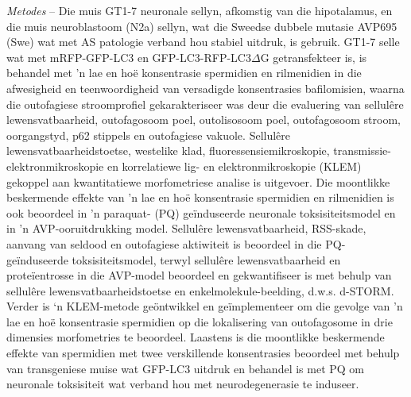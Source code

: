 \textit{Metodes} – Die muis GT1-7 neuronale sellyn, afkomstig van die hipotalamus, en die muis neuroblastoom (N2a) sellyn, wat die Sweedse dubbele mutasie AVP695 (Swe) wat met AS patologie verband hou stabiel uitdruk, is gebruik. GT1-7 selle wat met mRFP-GFP-LC3 en GFP-LC3-RFP-LC3$\Delta$G getransfekteer is, is behandel met 'n lae en ho{\"e} konsentrasie spermidien en rilmenidien in die afwesigheid en teenwoordigheid van versadigde konsentrasies bafilomisien, waarna die outofagiese stroomprofiel gekarakteriseer was deur die evaluering van sellulêre lewensvatbaarheid, outofagosoom poel, outolisosoom poel, outofagosoom stroom, oorgangstyd, p62 stippels en outofagiese vakuole. Sellul{\^e}re lewensvatbaarheidstoetse, westelike klad, fluoressensiemikroskopie, transmissie-elektronmikroskopie en korrelatiewe lig- en elektronmikroskopie (KLEM) gekoppel aan kwantitatiewe morfometriese analise is uitgevoer. Die moontlikke beskermende effekte van 'n lae en ho{\"e} konsentrasie spermidien en rilmenidien is ook beoordeel in 'n paraquat- (PQ) ge{\"i}nduseerde neuronale toksisiteitsmodel en in 'n AVP-ooruitdrukking model. Sellul{\^e}re lewensvatbaarheid, RSS-skade, aanvang van seldood en outofagiese aktiwiteit is beoordeel in die PQ-ge{\"i}nduseerde toksisiteitsmodel, terwyl sellul{\^e}re lewensvatbaarheid en prote{\"i}entrosse in die AVP-model beoordeel en gekwantifiseer is met behulp van sellul{\^e}re lewensvatbaarheidstoetse en enkelmolekule-beelding, d.w.s. d-STORM. Verder is ‘n KLEM-metode ge{\"o}ntwikkel en ge{\"i}mplementeer om die gevolge van 'n lae en ho{\"e} konsentrasie spermidien op die lokalisering van outofagosome in drie dimensies morfometries te beoordeel. Laastens is die moontlikke beskermende effekte van spermidien met twee verskillende konsentrasies beoordeel met behulp van transgeniese muise wat GFP-LC3 uitdruk en behandel is met PQ om neuronale toksisiteit wat verband hou met neurodegenerasie te induseer.

